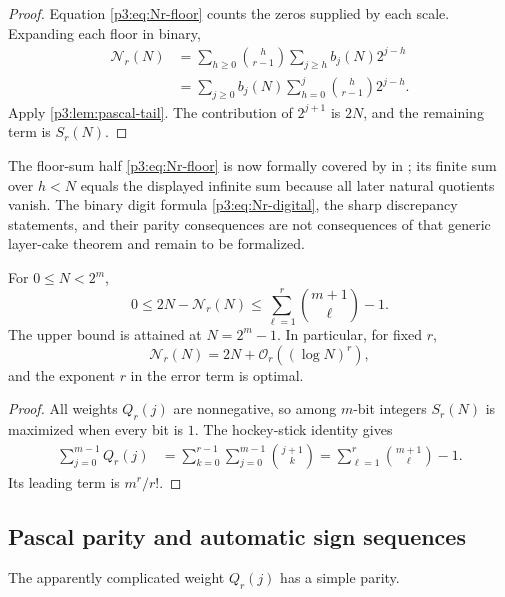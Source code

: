 \documentclass[11pt,oneside]{article}
\theoremstyle{definition}
\theoremstyle{remark}
\newcommand{\bigO}{\mathcal O}
\begin{document}
\begin{proof}
Equation \eqref{p3:eq:Nr-floor} counts the zeros supplied by each scale.  Expanding each floor in binary,
\begin{align*}
 \mathcal N_r(N)
 &=\sum_{h\ge0}\binom h{r-1}\sum_{j\ge h}b_j(N)2^{j-h}\\
 &=\sum_{j\ge0}b_j(N)
   \sum_{h=0}^{j}\binom h{r-1}2^{j-h}.
\end{align*}
Apply \cref{p3:lem:pascal-tail}.  The contribution of $2^{j+1}$ is $2N$, and the remaining term is $S_r(N)$.
\end{proof}

The floor-sum half \eqref{p3:eq:Nr-floor} is now formally covered by
 in
; its finite sum over $h<N$ equals the
displayed infinite sum because all later natural quotients vanish.  The
binary digit formula \eqref{p3:eq:Nr-digital}, the sharp discrepancy statements,
and their parity consequences are not consequences of that generic layer-cake
theorem and remain to be formalized.

\begin{corollary}\label{p3:cor:discrepancy-range}
For $0\le N<2^m$,
\begin{equation}\label{p3:eq:discrepancy-bound}
 0\le 2N-\mathcal N_r(N)
 \le \sum_{\ell=1}^{r}\binom{m+1}{\ell}-1.
\end{equation}
The upper bound is attained at $N=2^m-1$.  In particular, for fixed $r$,
\[
  \mathcal N_r(N)=2N+\bigO_r((\log N)^r),
\]
and the exponent $r$ in the error term is optimal.
\end{corollary}

\begin{proof}
All weights $Q_r(j)$ are nonnegative, so among $m$-bit integers $S_r(N)$ is maximized when every bit is $1$.  The hockey-stick identity gives
\begin{align*}
 \sum_{j=0}^{m-1}Q_r(j)
 &=\sum_{k=0}^{r-1}\sum_{j=0}^{m-1}\binom{j+1}{k}
 =\sum_{\ell=1}^{r}\binom{m+1}{\ell}-1.
\end{align*}
Its leading term is $m^r/r!$.
\end{proof}

\subsection{Pascal parity and automatic sign sequences}

The apparently complicated weight $Q_r(j)$ has a simple parity.
\end{document}
